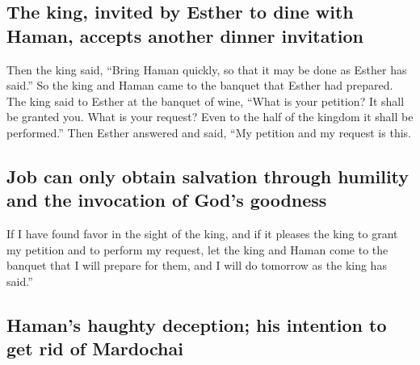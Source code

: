 \hypertarget{the-king-invited-by-esther-to-dine-with-haman-accepts-another-dinner-invitation}{%
\subsection{The king, invited by Esther to dine with Haman, accepts
another dinner
invitation}\label{the-king-invited-by-esther-to-dine-with-haman-accepts-another-dinner-invitation}}

 Then the king said, ``Bring Haman quickly, so that it may
be done as Esther has said.'' So the king and Haman came to the banquet
that Esther had prepared.  The king said to Esther at the
banquet of wine, ``What is your petition? It shall be granted you. What
is your request? Even to the half of the kingdom it shall be
performed.''  Then Esther answered and said, ``My petition
and my request is this.

\hypertarget{job-can-only-obtain-salvation-through-humility-and-the-invocation-of-gods-goodness}{%
\subsection{Job can only obtain salvation through humility and the
invocation of God's
goodness}\label{job-can-only-obtain-salvation-through-humility-and-the-invocation-of-gods-goodness}}

 If I have found favor in the sight of the king, and if it
pleases the king to grant my petition and to perform my request, let the
king and Haman come to the banquet that I will prepare for them, and I
will do tomorrow as the king has said.''

\hypertarget{hamans-haughty-deception-his-intention-to-get-rid-of-mardochai}{%
\subsection{Haman's haughty deception; his intention to get rid of
Mardochai}\label{hamans-haughty-deception-his-intention-to-get-rid-of-mardochai}}


